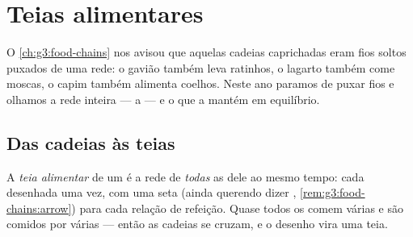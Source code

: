 \chapter{Teias alimentares}\label{ch:g5:food-webs}

O \cref{ch:g3:food-chains} nos avisou que aquelas cadeias
caprichadas eram fios soltos puxados de uma rede: o gavião também
leva ratinhos, o lagarto também come moscas, o capim também alimenta
coelhos. Neste ano paramos de puxar fios e olhamos a rede inteira ---
a  --- e o que a mantém em equilíbrio.

\section{Das cadeias às teias}

\begin{definition}\label{def:g5:food-webs:web}
A \emph{teia alimentar} de um  é a rede
de \emph{todas} as  dele ao mesmo tempo: cada
 desenhada uma vez, com uma seta (ainda querendo dizer \emph{}, \cref{rem:g3:food-chains:arrow}) para cada relação de
refeição. Quase todos os  comem várias  e são comidos
por várias --- então as cadeias se cruzam, e o desenho vira uma teia.
\end{definition}

